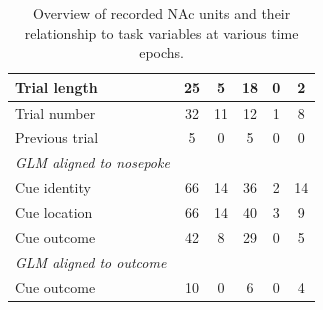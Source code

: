 \documentclass[11pt]{article}
\begin{document}
\begin{table}[p]
\begin{tabular}{l c  c c c c}
\hline
\hspace{6mm}Trial length       & 25        & 5          & 18         & 0         & 2\\
\hline
\hspace{6mm}Trial number       & 32         & 11          & 12         & 1          & 8\\
\hline
\hspace{6mm}Previous trial       & 5         & 0          &5          & 0          & 0\\
\hline
\hspace{3mm}\textit{GLM aligned to nosepoke}                       &         &       &          &          &\\
\hline
\hspace{6mm}Cue identity       & 66         &14          & 36          & 2          &14\\
\hline
\hspace{6mm}Cue location       & 66         &14          & 40          & 3          & 9\\
\hline
\hspace{6mm}Cue outcome       & 42        & 8          & 29        & 0          & 5\\
\hline
\hspace{3mm}\textit{GLM aligned to outcome}                       &         &       &          &          &\\
\hline
\hspace{6mm}Cue outcome       & 10        & 0          & 6       & 0          &4\\
\hline

\end{tabular}
\caption {Overview of recorded NAc units and their relationship to task variables at various time epochs.} \label{tbl1} 
\end{table}
\end{document}
